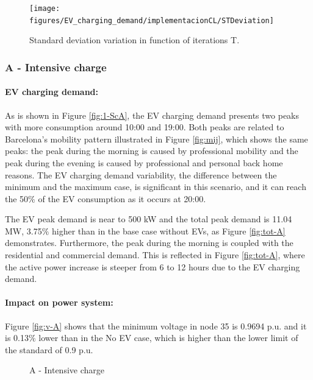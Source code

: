 \documentclass[a4paper,11pt,twoside,openright]{report}
\begin{document}
\begin{figure}[htbp]
	\centering
	\texttt{[image: figures/EV\_charging\_demand/implementacionCL/STDeviation]}
	\caption{Standard deviation variation in function of iterations T.}
	\label{fig:std_iter}
\end{figure}

\subsubsection{A - Intensive charge}

\paragraph{EV charging demand:}
As is shown in Figure \ref{fig:1-ScA}, the EV charging demand presents two peaks with more consumption around 10:00 and 19:00. Both peaks are related to Barcelona's mobility pattern illustrated in Figure \ref{fig:mij}, which shows the same peaks: the peak during the morning is caused by professional mobility and the peak during the evening is caused by professional and personal back home reasons. The EV charging demand variability, the difference between the minimum and the maximum case, is significant in this scenario, and it can reach the 50$\%$ of the EV consumption as it occurs at 20:00.

The EV peak demand is near to 500 kW and the total peak demand is 11.04 MW, 3.75$\%$ higher than in the base case without EVs, as Figure \ref{fig:tot-A} demonstrates. Furthermore, the peak during the morning is coupled with the residential and commercial demand. This is reflected in Figure \ref{fig:tot-A}, where the active power increase is steeper from 6 to 12 hours due to the EV charging demand.

\paragraph{Impact on power system:}
Figure \ref{fig:v-A} shows that the minimum voltage in node 35 is 0.9694 p.u. and it is 0.13$\%$ lower than in the No EV case, which is higher than the lower limit of the standard of 0.9 p.u. 
\begin{figure}[htbp]
	\centering
	\caption{A - Intensive charge}
\end{figure}
\end{document}
